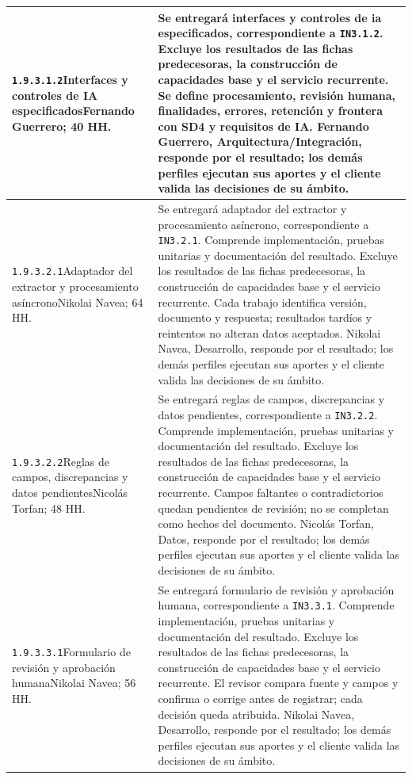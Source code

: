 \begin{longtable}{L{52mm}L{91mm}}
\texttt{1.\allowbreak{}9.\allowbreak{}3.\allowbreak{}1.\allowbreak{}2}\newline Interfaces y controles de IA especificados\newline Fernando Guerrero; 40 HH. & Se entregará interfaces y controles de ia especificados, correspondiente a \texttt{IN3.1.2}. Excluye los resultados de las fichas predecesoras, la construcción de capacidades base y el servicio recurrente.  Se define procesamiento, revisión humana, finalidades, errores, retención y frontera con SD4 y requisitos de IA. Fernando Guerrero, Arquitectura/Integración, responde por el resultado; los demás perfiles ejecutan sus aportes y el cliente valida las decisiones de su ámbito.\\\hline
\texttt{1.\allowbreak{}9.\allowbreak{}3.\allowbreak{}2.\allowbreak{}1}\newline Adaptador del extractor y procesamiento asíncrono\newline Nikolai Navea; 64 HH. & Se entregará adaptador del extractor y procesamiento asíncrono, correspondiente a \texttt{IN3.2.1}. Comprende implementación, pruebas unitarias y documentación del resultado. Excluye los resultados de las fichas predecesoras, la construcción de capacidades base y el servicio recurrente.  Cada trabajo identifica versión, documento y respuesta; resultados tardíos y reintentos no alteran datos aceptados. Nikolai Navea, Desarrollo, responde por el resultado; los demás perfiles ejecutan sus aportes y el cliente valida las decisiones de su ámbito.\\\hline
\texttt{1.\allowbreak{}9.\allowbreak{}3.\allowbreak{}2.\allowbreak{}2}\newline Reglas de campos, discrepancias y datos pendientes\newline Nicolás Torfan; 48 HH. & Se entregará reglas de campos, discrepancias y datos pendientes, correspondiente a \texttt{IN3.2.2}. Comprende implementación, pruebas unitarias y documentación del resultado. Excluye los resultados de las fichas predecesoras, la construcción de capacidades base y el servicio recurrente.  Campos faltantes o contradictorios quedan pendientes de revisión; no se completan como hechos del documento. Nicolás Torfan, Datos, responde por el resultado; los demás perfiles ejecutan sus aportes y el cliente valida las decisiones de su ámbito.\\\hline
\texttt{1.\allowbreak{}9.\allowbreak{}3.\allowbreak{}3.\allowbreak{}1}\newline Formulario de revisión y aprobación humana\newline Nikolai Navea; 56 HH. & Se entregará formulario de revisión y aprobación humana, correspondiente a \texttt{IN3.3.1}. Comprende implementación, pruebas unitarias y documentación del resultado. Excluye los resultados de las fichas predecesoras, la construcción de capacidades base y el servicio recurrente.  El revisor compara fuente y campos y confirma o corrige antes de registrar; cada decisión queda atribuida. Nikolai Navea, Desarrollo, responde por el resultado; los demás perfiles ejecutan sus aportes y el cliente valida las decisiones de su ámbito.\\\hline

\end{longtable}
